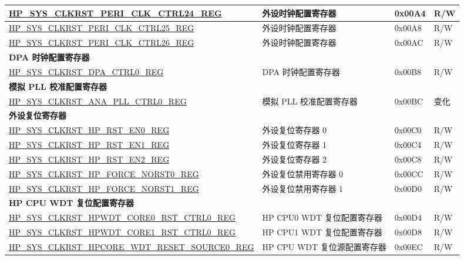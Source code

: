 \begin{longtable}{ | p{7.5cm} | p{6.2cm} | p{1.3cm} | p{1cm} | }
\hyperref[regdesc:HPSYSCLKRSTPERICLKCTRL24REG]{HP\_SYS\_CLKRST\_PERI\_CLK\_CTRL24\_REG} & 外设时钟配置寄存器  & 0x00A4 & R/W \\ \hline
\hyperref[regdesc:HPSYSCLKRSTPERICLKCTRL25REG]{HP\_SYS\_CLKRST\_PERI\_CLK\_CTRL25\_REG} & 外设时钟配置寄存器  & 0x00A8 & R/W \\ \hline
\hyperref[regdesc:HPSYSCLKRSTPERICLKCTRL26REG]{HP\_SYS\_CLKRST\_PERI\_CLK\_CTRL26\_REG} & 外设时钟配置寄存器  & 0x00AC & R/W \\ \hline
\multicolumn{4}{|l|}{\textbf{DPA 时钟配置寄存器}} \\ \hline
\hyperref[regdesc:HPSYSCLKRSTDPACTRL0REG]{HP\_SYS\_CLKRST\_DPA\_CTRL0\_REG} & DPA 时钟配置寄存器 & 0x00B8 & R/W \\ \hline
\multicolumn{4}{|l|}{\textbf{模拟 PLL 校准配置寄存器}} \\ \hline
\hyperref[regdesc:HPSYSCLKRSTANAPLLCTRL0REG]{HP\_SYS\_CLKRST\_ANA\_PLL\_CTRL0\_REG} & 模拟 PLL 校准配置寄存器 & 0x00BC & 变化 \\ \hline
\multicolumn{4}{|l|}{\textbf{外设复位寄存器}} \\ \hline
\hyperref[regdesc:HPSYSCLKRSTHPRSTEN0REG]{HP\_SYS\_CLKRST\_HP\_RST\_EN0\_REG} & 外设复位寄存器 0 & 0x00C0 & R/W \\ \hline
\hyperref[regdesc:HPSYSCLKRSTHPRSTEN1REG]{HP\_SYS\_CLKRST\_HP\_RST\_EN1\_REG} & 外设复位寄存器 1 & 0x00C4 & R/W \\ \hline
\hyperref[regdesc:HPSYSCLKRSTHPRSTEN2REG]{HP\_SYS\_CLKRST\_HP\_RST\_EN2\_REG} & 外设复位寄存器 2 & 0x00C8 & R/W \\ \hline
\hyperref[regdesc:HPSYSCLKRSTHPFORCENORST0REG]{HP\_SYS\_CLKRST\_HP\_FORCE\_NORST0\_REG} & 外设复位禁用寄存器 0 & 0x00CC & R/W \\ \hline
\hyperref[regdesc:HPSYSCLKRSTHPFORCENORST1REG]{HP\_SYS\_CLKRST\_HP\_FORCE\_NORST1\_REG} & 外设复位禁用寄存器 1 & 0x00D0 & R/W \\ \hline
\multicolumn{4}{|l|}{\textbf{HP CPU WDT 复位配置寄存器}} \\ \hline
\hyperref[regdesc:HPSYSCLKRSTHPWDTCORE0RSTCTRL0REG]{HP\_SYS\_CLKRST\_HPWDT\_CORE0\_RST\_CTRL0\newline\_REG} & HP CPU0 WDT 复位配置寄存器 & 0x00D4 & R/W \\ \hline
\hyperref[regdesc:HPSYSCLKRSTHPWDTCORE1RSTCTRL0REG]{HP\_SYS\_CLKRST\_HPWDT\_CORE1\_RST\_CTRL0\newline\_REG} & HP CPU1 WDT 复位配置寄存器 & 0x00D8 & R/W \\ \hline
\hyperref[regdesc:HPSYSCLKRSTHPCOREWDTRESETSOURCE0REG]{HP\_SYS\_CLKRST\_HPCORE\_WDT\_RESET\newline\_SOURCE0\_REG} & HP CPU WDT 复位源配置寄存器 & 0x00EC & R/W \\ \hline

\end{longtable}
